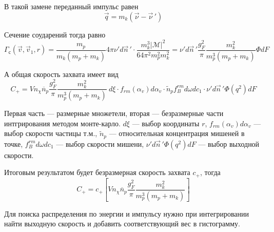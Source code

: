 В такой замене переданный импульс равен
\begin{equation*}
	\vec{q} = m_{k}\left( \vec{\nu} - {\vec{\nu}}\,' \right)
\end{equation*}

Сечение соударений тогда равно
\begin{equation*}
	\Gamma_{с}\left( {\vec{v},{\vec{v}}_{1},r} \right) = \frac{m_{p}}{m_{k}\left( m_{p} + m_{k} \right)}4\pi\nu'd\vec{n}\,' \cdot \frac{m_{k}^{3}\left| \mathcal{M} \right|^{2}}{64\pi^{2}m_{p}^{2}m_{k}^{2}} = \nu' d\vec{n}\,'\frac{g_{F}^{2}}{\pi}\frac{m_{k}^{2}}{m_{p}^{3}\left( m_{p} + m_{k} \right)}\Phi dF
\end{equation*}

А общая скорость захвата имеет вид
\begin{equation}
	\label{eq:capture_rate_result}
	C_+ = Vn_{\chi}{\overline{n}}_{p}\frac{g_{F}^{2}}{\pi}\frac{m_{k}^{2}}{m_{p}^{3}\left( {m_{p} + m_{k}} \right)}~d\xi \cdot f_{rm}\left( \alpha_{v} \right)d\alpha_{v} \cdot {\widetilde{n}}_{p}f_{B}^{rm}d\omega dc_{1} \cdot \nu' d\vec{n}\,'\Phi\left( q^{2} \right)dF
\end{equation}

Первая часть --- размерные множетели, вторая --- безразмерные части интгрирования методом монте-карло. $d\xi$ --- выбор координаты $r$, $f_{rm}\left( \alpha_{v} \right)d\alpha_{v}$ --- выбор скорости частицы т.м., ${\widetilde{n}}_{p}$ --- относительная концентрация мишеней в точке, $f_{B}^{rm}d\omega dc_{1}$ --- выбор скорости мишени, $\nu' d\vec{n}\,'\Phi\left( q^{2} \right)dF$ --- выбор выходной скорости.

Итоговым результатом будет безразмерная скорость захвата $c_+$, тогда
\begin{equation*}
	C_+ = c_+ \left[ Vn_{\chi}{\overline{n}}_{p}\frac{g_{F}^{2}}{\pi}\frac{m_{k}^{2}}{m_{p}^{3}\left( {m_{p} + m_{k}} \right)}
	\right]
\end{equation*}

Для поиска распределения по энергии и импульсу нужно при интегрировании  найти выходную скорость и добавить соответствующий вес в гистограмму.




